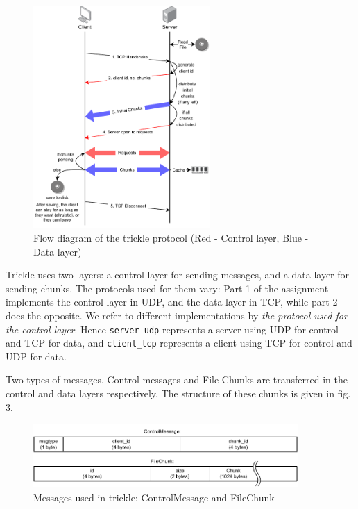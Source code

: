\documentclass[12pt]{article}
\begin{document}
\begin{figure}[H]
  \centering
  \includegraphics[width=0.6\textwidth]{protocol.pdf}
  \caption{Flow diagram of the trickle protocol (Red - Control layer, Blue - Data layer)}
\end{figure}

Trickle uses two layers: a control layer for sending messages, and a data layer for sending chunks. The protocols used for them vary: Part 1 of the assignment implements the control layer in UDP, and the data layer in TCP, while part 2 does the opposite. We refer to different implementations by \emph{the protocol used for the control layer}. Hence \texttt{server\_udp} represents a server using UDP for control and TCP for data, and \texttt{client\_tcp} represents a client using TCP for control and UDP for data. 

Two types of messages, Control messages and File Chunks are transferred in the control and data layers respectively. The structure of these chunks is given in fig. 3.

\begin{figure}[H]
  \centering
  \includegraphics[width=0.9\textwidth]{messages.pdf}
  \caption{Messages used in trickle: ControlMessage and FileChunk}
\end{figure}
\end{document}
